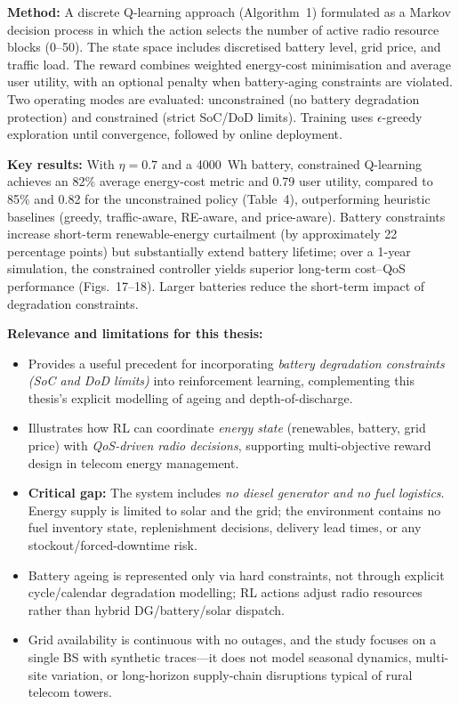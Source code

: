 \textbf{Method:} A discrete Q-learning approach (Algorithm~1) formulated as a Markov decision process in which the action selects the number of active radio resource blocks (0--50). The state space includes discretised battery level, grid price, and traffic load. The reward combines weighted energy-cost minimisation and average user utility, with an optional penalty when battery-aging constraints are violated. Two operating modes are evaluated: unconstrained (no battery degradation protection) and constrained (strict SoC/DoD limits). Training uses $\epsilon$-greedy exploration until convergence, followed by online deployment.

\textbf{Key results:} With $\eta = 0.7$ and a 4000~Wh battery, constrained Q-learning achieves an 82\% average energy-cost metric and 0.79 user utility, compared to 85\% and 0.82 for the unconstrained policy (Table~4), outperforming heuristic baselines (greedy, traffic-aware, RE-aware, and price-aware). Battery constraints increase short-term renewable-energy curtailment (by approximately 22 percentage points) but substantially extend battery lifetime; over a 1-year simulation, the constrained controller yields superior long-term cost--QoS performance (Figs.~17--18). Larger batteries reduce the short-term impact of degradation constraints.

\textbf{Relevance and limitations for this thesis:}
\begin{itemize}
    \item Provides a useful precedent for incorporating \emph{battery degradation constraints (SoC and DoD limits)} into reinforcement learning, complementing this thesis's explicit modelling of ageing and depth-of-discharge.
    \item Illustrates how RL can coordinate \emph{energy state} (renewables, battery, grid price) with \emph{QoS-driven radio decisions}, supporting multi-objective reward design in telecom energy management.
    \item \textbf{Critical gap:} The system includes \emph{no diesel generator and no fuel logistics}. Energy supply is limited to solar and the grid; the environment contains no fuel inventory state, replenishment decisions, delivery lead times, or any stockout/forced-downtime risk.
    \item Battery ageing is represented only via hard constraints, not through explicit cycle/calendar degradation modelling; RL actions adjust radio resources rather than hybrid DG/battery/solar dispatch.
    \item Grid availability is continuous with no outages, and the study focuses on a single BS with synthetic traces---it does not model seasonal dynamics, multi-site variation, or long-horizon supply-chain disruptions typical of rural telecom towers.
\end{itemize}

